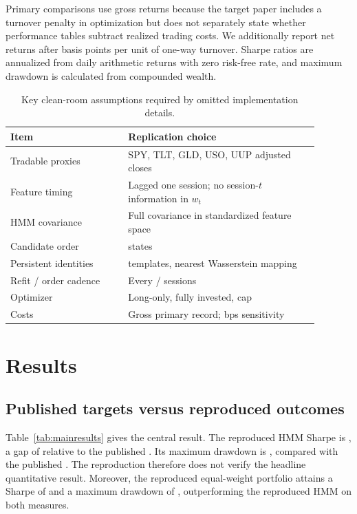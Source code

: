 \documentclass[11pt]{article}
\begin{document}
Primary comparisons use gross returns because the target paper includes a turnover penalty in optimization but does not separately state whether performance tables subtract realized trading costs. We additionally report net returns after \RealizedCost{} basis points per unit of one-way turnover. Sharpe ratios are annualized from daily arithmetic returns with zero risk-free rate, and maximum drawdown is calculated from compounded wealth.

\begin{table}[H]
\centering
\caption{Key clean-room assumptions required by omitted implementation details.}
\label{tab:assumptions}
\begin{tabular}{p{0.34\linewidth}p{0.55\linewidth}}
\toprule
Item & Replication choice \\
\midrule
Tradable proxies & SPY, TLT, GLD, USO, UUP adjusted closes \\
Feature timing & Lagged one session; no session-\(t\) information in \(w_t\) \\
HMM covariance & Full covariance in standardized feature space \\
Candidate order & \CandidateStates{} states \\
Persistent identities & \TemplateCount{} templates, nearest Wasserstein mapping \\
Refit / order cadence & Every \RefitFrequency{} / \OrderFrequency{} sessions \\
Optimizer & Long-only, fully invested, \MaxWeight{} cap \\
Costs & Gross primary record; \RealizedCost{} bps sensitivity \\
\bottomrule
\end{tabular}
\end{table}

\section{Results}

\subsection{Published targets versus reproduced outcomes}

Table~\ref{tab:mainresults} gives the central result. The reproduced HMM Sharpe is \RepHMMSharpe{}, a gap of \HMMSharpeGap{} relative to the published \PubHMMSharpe{}. Its maximum drawdown is \RepHMMMaxDD{}, compared with the published \PubHMMMaxDD{}. The reproduction therefore does not verify the headline quantitative result. Moreover, the reproduced equal-weight portfolio attains a Sharpe of \RepEqualSharpe{} and a maximum drawdown of \RepEqualMaxDD{}, outperforming the reproduced HMM on both measures.
\end{document}
